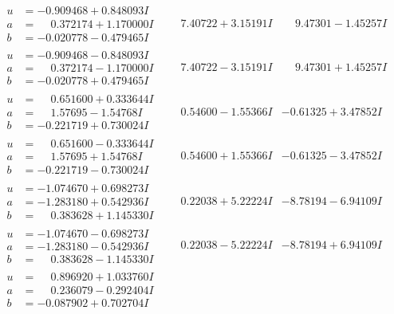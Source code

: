 \documentclass[1p]{elsarticle_modified}
\theoremstyle{definition}
\begin{document}
$$\begin{array}{c|c|c}
\begin{aligned}
u &= -0.909468 + 0.848093 I \\
a &= \phantom{-}0.372174 + 1.170000 I \\
b &= -0.020778 - 0.479465 I\end{aligned}
 & \phantom{-}7.40722 + 3.15191 I & \phantom{-}9.47301 - 1.45257 I \\ \hline\begin{aligned}
u &= -0.909468 - 0.848093 I \\
a &= \phantom{-}0.372174 - 1.170000 I \\
b &= -0.020778 + 0.479465 I\end{aligned}
 & \phantom{-}7.40722 - 3.15191 I & \phantom{-}9.47301 + 1.45257 I \\ \hline\begin{aligned}
u &= \phantom{-}0.651600 + 0.333644 I \\
a &= \phantom{-}1.57695 - 1.54768 I \\
b &= -0.221719 + 0.730024 I\end{aligned}
 & \phantom{-}0.54600 - 1.55366 I & -0.61325 + 3.47852 I \\ \hline\begin{aligned}
u &= \phantom{-}0.651600 - 0.333644 I \\
a &= \phantom{-}1.57695 + 1.54768 I \\
b &= -0.221719 - 0.730024 I\end{aligned}
 & \phantom{-}0.54600 + 1.55366 I & -0.61325 - 3.47852 I \\ \hline\begin{aligned}
u &= -1.074670 + 0.698273 I \\
a &= -1.283180 + 0.542936 I \\
b &= \phantom{-}0.383628 + 1.145330 I\end{aligned}
 & \phantom{-}0.22038 + 5.22224 I & -8.78194 - 6.94109 I \\ \hline\begin{aligned}
u &= -1.074670 - 0.698273 I \\
a &= -1.283180 - 0.542936 I \\
b &= \phantom{-}0.383628 - 1.145330 I\end{aligned}
 & \phantom{-}0.22038 - 5.22224 I & -8.78194 + 6.94109 I \\ \hline\begin{aligned}
u &= \phantom{-}0.896920 + 1.033760 I \\
a &= \phantom{-}0.236079 - 0.292404 I \\
b &= -0.087902 + 0.702704 I\end{aligned}

\end{array}$$
\end{document}

